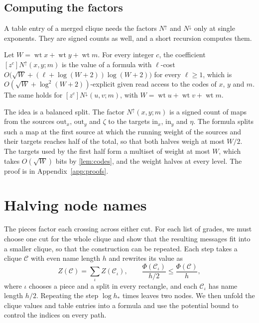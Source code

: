 \documentclass[11pt]{article}
\theoremstyle{definition}
\theoremstyle{definition}
\theoremstyle{remark}
\newcommand{\wt}{\operatorname{wt}}
\newcommand{\out}{\mathrm{out}}
\newcommand{\inn}{\mathrm{in}}
\newcommand{\Nup}{N^{\uparrow}}
\newcommand{\Ndown}{N^{\downarrow}}
\begin{document}
\subsection{Computing the factors}

A table entry of a merged clique needs the factors $\Nup$ and $\Ndown$ only at single exponents. They are signed counts as well, and a short recursion computes them.

\begin{lemma}\label{lem:transport}
Let $W=\wt x+\wt y+\wt m$. For every integer $c$, the coefficient $[z^c]\Nup(x,y;m)$ is the value of a formula with $\ell$-cost $O\bigl(\sqrt W+(\ell+\log(W+2))\log(W+2)\bigr)$ for every $\ell\ge1$, which is $O(\sqrt W+\log^2(W+2))$-explicit given read access to the codes of $x$, $y$ and $m$. The same holds for $[z^c]\Ndown(u,v;m)$, with $W=\wt u+\wt v+\wt m$.
\end{lemma}

The idea is a balanced split. The factor $\Nup(x,y;m)$ is a signed count of maps from the sources $\out_x$, $\out_y$ and $\zeta$ to the targets $\inn_x$, $\inn_y$ and $\eta$. The formula splits such a map at the first source at which the running weight of the sources and their targets reaches half of the total, so that both halves weigh at most $W/2$. The targets used by the first half form a multiset of weight at most $W$, which takes $O(\sqrt W)$ bits by \cref{lem:codes}, and the weight halves at every level. The proof is in Appendix~\ref{app:proofs}.

\section{Halving node names}\label{sec:halving}

The pieces factor each crossing across either cut. For each list of grades, we must choose one cut for the whole clique and show that the resulting messages fit into a smaller clique, so that the construction can be repeated. Each step takes a clique $\mathcal C$ with even name length $h$ and rewrites its value as
\[
Z(\mathcal C)=\sum_\iota Z(\mathcal C_\iota),\qquad\frac{\Phi(\mathcal C_\iota)}{h/2}\le\frac{\Phi(\mathcal C)}h,
\]
where $\iota$ chooses a piece and a split in every rectangle, and each $\mathcal C_\iota$ has name length $h/2$. Repeating the step $\log h_*$ times leaves two nodes. We then unfold the clique values and table entries into a formula and use the potential bound to control the indices on every path.
\end{document}
